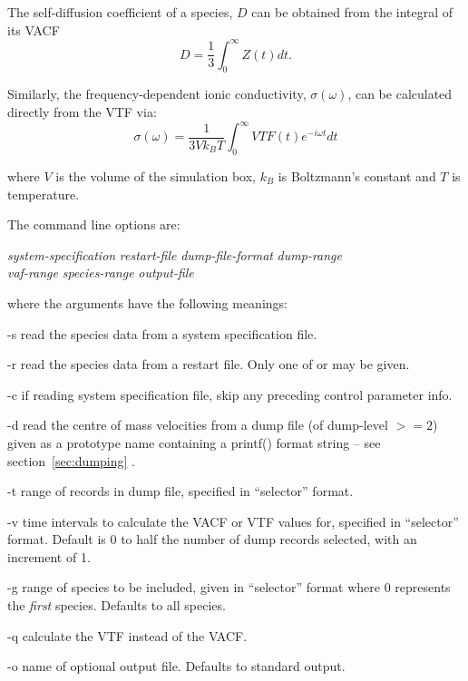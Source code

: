 \documentclass[a4paper,twoside]{report}
\begin{document}
The self-diffusion coefficient of a species, $D$ can be
obtained from the integral of its VACF
\begin{equation}
  D = \frac{1}{3} \int_0^\infty Z(t) dt .
\end{equation}

Similarly, the frequency-dependent ionic conductivity, $\sigma(\omega)$, can
be calculated directly from the VTF via:
\begin{equation}
  \sigma(\omega) = \frac{1}{3 V k_B T}    \int_0^\infty VTF(t) e^{-i \omega t} dt
\end{equation}

where $V$ is the volume of the simulation box, $k_{B}$ is Boltzmann's
constant and $T$ is temperature.

The command line options are:

\begin{center}
\Lit{[-s} \textit{system-specification} \Lit{]|}
\Lit{[-r} \textit{restart-file} \Lit{]}
\Lit{[-d} \textit{dump-file-format} \Lit{]}
\Lit{[-t} \textit{dump-range} \Lit{]} \\
\Lit{[-v} \textit{vaf-range}\Lit{]}
\Lit{[-g} \textit{species-range}\Lit{]} 
\Lit{[-c]}
\Lit{[-q]} 
\Lit{[-o} \textit{output-file}\Lit{]}
\end{center}

where the arguments have the following meanings:
\begin{Argdescription}
\item[-s] read the species data from a system specification file.
\item[-r] read the species data from a restart file. Only one of  
or  may be given.
\item[-c] if reading system specification file, skip any preceding control 
parameter info.
\item[-d] read the centre of mass velocities from a dump file (of dump-level 
$>= 2$) given as a prototype name containing a printf() format 
string -- see section~\ref{sec:dumping} .
\item[-t] range of records in dump file, specified in ``selector'' format.
\item[-v] time intervals to calculate the VACF or VTF values for, specified 
in ``selector'' format. Default is 0 to half the number of dump 
records selected, with an increment of 1.
\item[-g] range of species to be included, given in ``selector'' format 
where 0 represents the \emph{first} species. Defaults to all species.
\item[-q] calculate the VTF instead of the VACF.
\item[-o] name of optional output file. Defaults to standard output.
\end{Argdescription}
\end{document}
